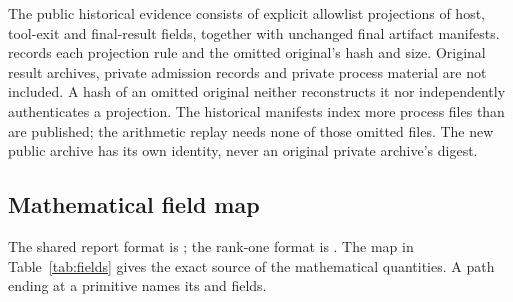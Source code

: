 \documentclass[11pt,a4paper]{article}
\theoremstyle{definition}
\theoremstyle{remark}
\numberwithin{equation}{section}
\begin{document}
The public historical evidence consists of explicit allowlist projections
of host, tool-exit and final-result fields, together with unchanged final
artifact manifests.  records each projection rule
and the omitted original's hash and size. Original result archives,
private admission records and private process material are not included.
A hash of an omitted original neither reconstructs it nor independently
authenticates a projection. The historical manifests index more process
files than are published; the arithmetic replay needs none of those
omitted files. The new public archive has its own identity, never an
original private archive's digest.

\subsection{Mathematical field map}

The shared report format is
;
the rank-one format is .
The map in Table~\ref{tab:fields} gives the exact source of the mathematical
quantities. A path ending at a primitive names its
 and  fields.
\end{document}
